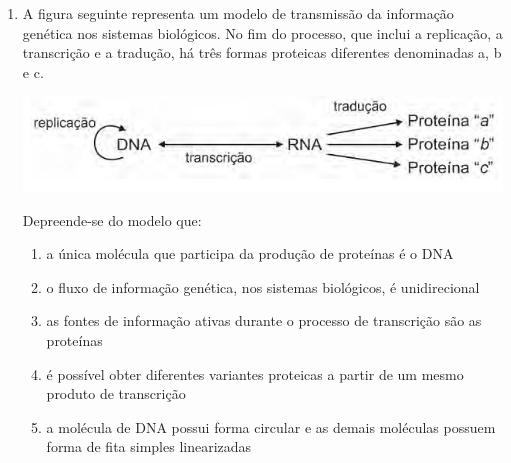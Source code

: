\documentclass[10pt,a4paper]{article}
\newenvironment{Figure}
  {\par\medskip\noindent\minipage{\linewidth}}
  {\endminipage\par\medskip}
\begin{document}
\begin{multicols}{2}
\begin{enumerate}
		\begin{enumerate}
		\item No processo indicado pela letra A, ocorre meiose, uma vez que uma \'unica c\'elula haploide (chamada esporo) gera um indiv\'iduo multicelular tamb\'em haploide, o protalo
		\item O ovo ou zigoto, indicado pela letra B, \'e uma c\'elula haploide, uma vez que foi formado pela uni\~ao do \'ovulo e do anteroz\'oide
		\item No processo indicado pela letra C, ocorre mitose, uma vez que uma \'unica c\'elula diploide (chamada zigoto) gera um indiv\'iduo multicelular tamb\'em diploide, o espor \'ofito
		\item O broto jovem, indicado pela letra D, composto por c\'elulas diploides, continuar\'a crescendo, desenvolvendo o espor\'ofito, atrav\'es da meiose de suas c\'elulas 
		\item No processo indicado pela letra E, cada esporângio (diploide) gerar\'a, atrav\'es da meiose, dois esporos (haploides)
		\end{enumerate}

	\item A figura seguinte representa um modelo de transmiss\~ao da informa\c{c}\~ao gen\'etica nos sistemas biol\'ogicos. No fim do processo, que inclui a replica\c{c}\~ao, a transcri\c{c}\~ao e a tradu\c{c}\~ao, h\'a tr\^es formas proteicas diferentes denominadas a, b e c.

\begin{Figure}
     \includegraphics[width=\linewidth]{dna_rna_bio.jpg}
\end{Figure}

	Depreende-se do modelo que:

		\begin{enumerate}
		\item a \'unica mol\'ecula que participa da produ\c{c}\~ao de prote\'inas \'e o DNA
		\item o fluxo de informa\c{c}\~ao gen\'etica, nos sistemas biol\'ogicos, \'e unidirecional
		\item as fontes de informa\c{c}\~ao ativas durante o processo de transcri\c{c}\~ao s\~ao as prote\'inas
		\item \'e poss\'ivel obter diferentes variantes proteicas a partir de um mesmo produto de transcri\c{c}\~ao 
		\item a mol\'ecula de DNA possui forma circular e as demais mol\'eculas possuem forma de fita simples linearizadas
		\end{enumerate}


\end{enumerate}
\end{multicols}
\end{document}
